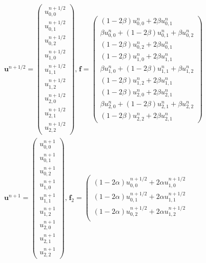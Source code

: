 \begin{align}
  \mathbf{u}^{n+1/2} = 
  \left(\begin{array}{c}
        u^{n+1/2}_{0,0}\\u^{n+1/2}_{0,1}\\u^{n+1/2}_{0,2}\\
        u^{n+1/2}_{1,0}\\u^{n+1/2}_{1,1}\\u^{n+1/2}_{1,2}\\
        u^{n+1/2}_{2,0}\\u^{n+1/2}_{2,1}\\u^{n+1/2}_{2,2}
       \end{array}\right)\text{,}\;
 \mathbf{f} = 
  \left(\begin{array}{c}
        (1-2\beta)u^{n}_{0,0}+2\beta u^{n}_{0,1}\\ \beta u^{n}_{0,0}+ (1-2\beta)u^{n}_{0,1}+\beta u^{n}_{0,2} \\(1-2\beta)u^{n}_{0,2}+2\beta u^{n}_{0,1}\\
        (1-2\beta)u^{n}_{1,0}+2\beta u^{n}_{1,1}\\ \beta u^{n}_{1,0}+ (1-2\beta)u^{n}_{1,1}+\beta u^{n}_{1,2}\\ (1-2\beta)u^{n}_{1,2}+2\beta u^{n}_{1,1}\\
        (1-2\beta)u^{n}_{2,0}+2\beta u^{n}_{2,1}\\ \beta u^{n}_{2,0}+ (1-2\beta)u^{n}_{2,1}+\beta u^{n}_{2,2}\\(1-2\beta)u^{n}_{2,2}+2\beta u^{n}_{2,1}
       \end{array}\right)\label{ADI_vectors_step1} \\
 \mathbf{u}^{n+1} = 
  \left(\begin{array}{c}
        u^{n+1}_{0,0}\\u^{n+1}_{0,1}\\u^{n+1}_{0,2}\\
        u^{n+1}_{1,0}\\u^{n+1}_{1,1}\\u^{n+1}_{1,2}\\
        u^{n+1}_{2,0}\\u^{n+1}_{2,1}\\u^{n+1}_{2,2}
       \end{array}\right)\text{,}\;
 \mathbf{f}_2 = 
  \left(\begin{array}{c}
        (1-2\alpha)u^{n+1/2}_{0,0}+2\alpha u^{n+1/2}_{1,0}\\(1-2\alpha)u^{n+1/2}_{0,1}+2\alpha u^{n+1/2}_{1,1}\\(1-2\alpha)u^{n+1/2}_{0,2}+2\alpha u^{n+1/2}_{1,2}\\

\end{array}
\end{align}
